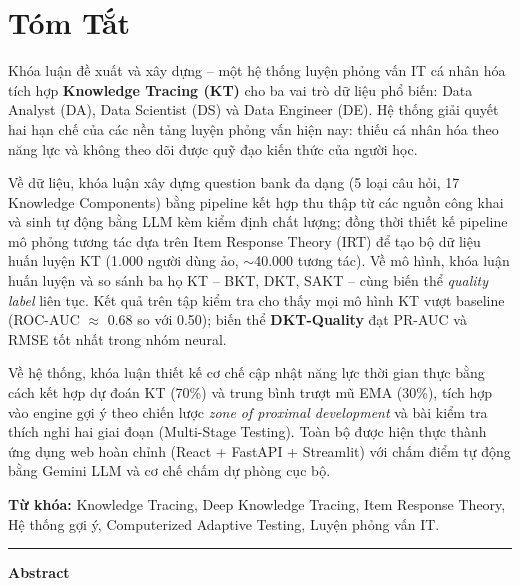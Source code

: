 \chapter*{Tóm Tắt}

Khóa luận đề xuất và xây dựng \system{} -- một hệ thống luyện phỏng vấn IT cá nhân hóa tích hợp \textbf{Knowledge Tracing (KT)} cho ba vai trò dữ liệu phổ biến: Data Analyst (DA), Data Scientist (DS) và Data Engineer (DE). Hệ thống giải quyết hai hạn chế của các nền tảng luyện phỏng vấn hiện nay: thiếu cá nhân hóa theo năng lực và không theo dõi được quỹ đạo kiến thức của người học.

Về dữ liệu, khóa luận xây dựng question bank đa dạng (5 loại câu hỏi, 17 Knowledge Components) bằng pipeline kết hợp thu thập từ các nguồn công khai và sinh tự động bằng LLM kèm kiểm định chất lượng; đồng thời thiết kế pipeline mô phỏng tương tác dựa trên Item Response Theory (IRT) để tạo bộ dữ liệu huấn luyện KT (1.000 người dùng ảo, $\sim$40.000 tương tác). Về mô hình, khóa luận huấn luyện và so sánh ba họ KT -- BKT, DKT, SAKT -- cùng biến thể \textit{quality label} liên tục. Kết quả trên tập kiểm tra cho thấy mọi mô hình KT vượt baseline (ROC-AUC $\approx$ 0.68 so với 0.50); biến thể \textbf{DKT-Quality} đạt PR-AUC và RMSE tốt nhất trong nhóm neural.

Về hệ thống, khóa luận thiết kế cơ chế cập nhật năng lực thời gian thực bằng cách kết hợp dự đoán KT (70\%) và trung bình trượt mũ EMA (30\%), tích hợp vào engine gợi ý theo chiến lược \textit{zone of proximal development} và bài kiểm tra thích nghi hai giai đoạn (Multi-Stage Testing). Toàn bộ được hiện thực thành ứng dụng web hoàn chỉnh (React + FastAPI + Streamlit) với chấm điểm tự động bằng Gemini LLM và cơ chế chấm dự phòng cục bộ.

\textbf{Từ khóa:} Knowledge Tracing, Deep Knowledge Tracing, Item Response Theory, Hệ thống gợi ý, Computerized Adaptive Testing, Luyện phỏng vấn IT.

\vspace{0.6cm}
\begin{center}\rule{0.5\textwidth}{0.4pt}\end{center}
\vspace{0.3cm}

\noindent\textbf{\large Abstract}

